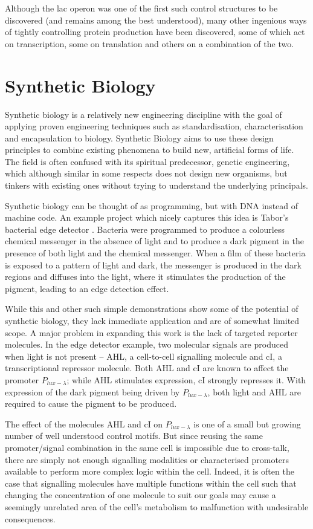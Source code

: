Although the lac operon was one of the first such control structures to be
discovered (and remains among the best understood), many other ingenious ways
of tightly controlling protein production have been discovered, some of which
act on transcription, some on translation and others on a combination of the
two.

\section{Synthetic Biology}
\label{sec:synbio}

Synthetic biology is a relatively new
engineering discipline with the goal of applying proven engineering techniques
such as standardisation, characterisation and encapsulation to biology.
Synthetic Biology aims to use these design principles to combine existing 
phenomena to build new, artificial forms of life.
The field is often confused with its spiritual predecessor, genetic 
engineering, which although similar in some respects does not design new
organisms, but tinkers with existing ones without trying to understand the
underlying principals.

Synthetic biology can be thought of as programming, but with DNA instead of 
machine code.
An example project which nicely captures this idea is Tabor's bacterial edge
detector \citep{edgeDetector}.
Bacteria were programmed to produce a colourless chemical messenger in the 
absence of light and to produce a dark pigment in the presence of both light 
and the chemical messenger.
When a film of these bacteria is exposed to a pattern of light and dark, the
messenger is produced in the dark regions and diffuses into the light, where it
stimulates the production of the pigment, 
leading to an edge detection effect.

While this and other such simple demonstrations show some of the potential 
of synthetic biology, they lack immediate application and are of somewhat 
limited scope.
A major problem in expanding this work is the lack of targeted reporter
molecules.
In the edge detector example, two molecular signals are produced when light is 
not present -- AHL, a cell-to-cell signalling molecule and cI, a
transcriptional repressor molecule.
Both AHL and cI are known to affect the promoter $P_{lux-\lambda}$; while AHL 
stimulates expression, cI strongly represses it.
With expression of the dark pigment being driven by $P_{lux-\lambda}$, 
both light and AHL are required to cause the pigment to be produced.

The effect of the molecules AHL and cI on $P_{lux-\lambda}$ is one of a small
but growing number of well understood control motifs.
But since reusing the same promoter/signal combination in the same cell is 
impossible due to cross-talk, there are simply not enough signalling modalities 
or characterised promoters available to perform more complex logic within the 
cell.
Indeed, it is often the case that signalling molecules have multiple functions
within the cell such that changing the concentration of one molecule to suit
our goals may cause a seemingly unrelated area of the cell's metabolism to
malfunction with undesirable consequences.

